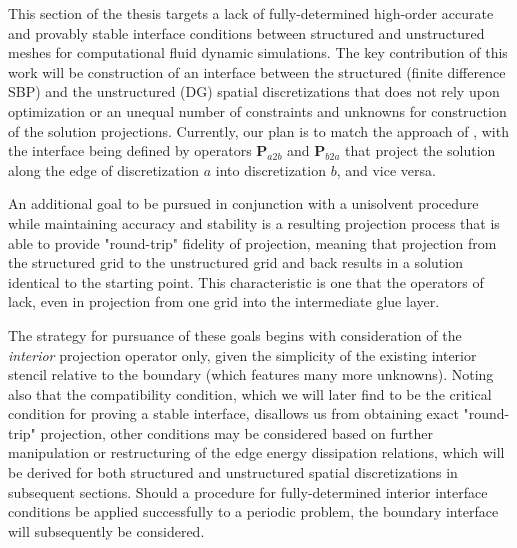 
This section of the thesis targets a lack of fully-determined high-order
accurate and provably stable interface conditions between structured and unstructured
meshes for computational fluid dynamic simulations. The key contribution of this work
will be construction of an interface between the structured (finite difference SBP)
and the unstructured (DG) spatial discretizations that does not rely upon
optimization or an unequal number of constraints and unknowns for construction
of the solution projections. Currently, our plan is to match the approach of
\cite{kozdon2016stable}, with the interface being defined by operators $\pmb{P}_{a2b}$
and $\pmb{P}_{b2a}$ that project the solution along the edge of discretization $a$
into discretization $b$, and vice versa.

An additional goal to be pursued in conjunction with a unisolvent procedure while
maintaining accuracy and stability is a resulting projection process that is able to
provide "round-trip" fidelity of projection, meaning that projection from the structured
grid to the unstructured grid and back results in a solution identical to the starting
point. This characteristic is one that the operators of \cite{kozdon2016stable} lack,
even in projection from one grid into the intermediate glue layer.

The strategy for pursuance of these goals begins with consideration of the
\emph{interior} projection operator only, given the simplicity of the existing
interior stencil relative to the boundary (which features many more unknowns).
Noting also that the compatibility condition, which we will later find to be the
critical condition for proving a stable interface, disallows us from obtaining
exact "round-trip" projection, other conditions may be considered based
on further manipulation or restructuring of the edge energy dissipation relations,
which will be derived for both structured and unstructured spatial discretizations
in subsequent sections. Should a procedure for fully-determined interior interface
conditions be applied successfully to a periodic problem, the boundary interface
will subsequently be considered.


